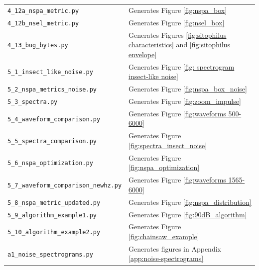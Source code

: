 \documentclass[../Vibro-Acoustic Signatures and Detection Algorithms for Stored Product Insects.tex]{subfiles}
\begin{document}
\begin{table}[!htbp]
\begin{tabular}{@{}ll@{}}
    \texttt{4\_12a\_nspa\_metric.py}              & Generates Figure \ref{fig:nspa_box}                                                                          \\
    \texttt{4\_12b\_nsel\_metric.py}              & Generates Figure \ref{fig:nsel_box}                                                                          \\
    \texttt{4\_13\_bug\_bytes.py}                 & Generates Figures \ref{fig:sitophilus characteristics} and \ref{fig:sitophilus envelope}                     \\
    \texttt{5\_1\_insect\_like\_noise.py}         & Generates Figure \ref{fig: spectrogram insect-like noise}                                                    \\
    \texttt{5\_2\_nspa\_metrics\_noise.py}        & Generates Figure \ref{fig:nspa_box_noise}                                                                    \\
    \texttt{5\_3\_spectra.py}                     & Generates Figure \ref{fig:zoom_impulse}                                                        \\
    \texttt{5\_4\_waveform\_comparison.py}        & Generates Figure \ref{fig:waveforms 500-6000}                                                                \\
    \texttt{5\_5\_spectra\_comparison.py}         & Generates Figure \ref{fig:spectra_insect_noise}                                                              \\
    \texttt{5\_6\_nspa\_optimization.py}          & Generates Figure \ref{fig:nspa_optimization}                                                                 \\
    \texttt{5\_7\_waveform\_comparison\_newhz.py} & Generates Figure \ref{fig:waveforms 1565-6000}                                                               \\
    \texttt{5\_8\_nspa\_metric\_updated.py}       & Generates Figure \ref{fig:nspa_distribution}                                                                 \\
    \texttt{5\_9\_algorithm\_example1.py}         & Generates Figure \ref{fig:90dB_algorithm}                                                                    \\
    \texttt{5\_10\_algorithm\_example2.py}        & Generates Figure \ref{fig:chainsaw_example}                                                                  \\
    \texttt{a1\_noise\_spectrograms.py}           & Generates figures in Appendix \ref{app:noise-spectrograms}                                                                \\

    \bottomrule
  \end{tabular}
\end{table}
\end{document}
